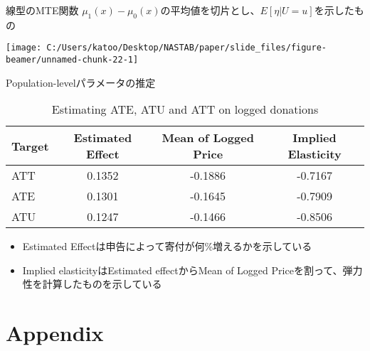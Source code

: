 \documentclass[
  ignorenonframetext,
  aspectratio=169,
]{beamer}
\providecommand{\tightlist}{%
  \setlength{\itemsep}{0pt}\setlength{\parskip}{0pt}}
\begin{document}
\begin{frame}{線型のMTE関数}
\protect\hypertarget{ux7ddaux578bux306emteux95a2ux6570}{}
\(\mu_1(x) - \mu_0(x)\)の平均値を切片とし、\(E[\eta | U = u]\)を示したもの

\begin{center}\texttt{[image: C:/Users/katoo/Desktop/NASTAB/paper/slide\_files/figure-beamer/unnamed-chunk-22-1]} \end{center}
\end{frame}

\begin{frame}{Population-levelパラメータの推定}
\protect\hypertarget{population-levelux30d1ux30e9ux30e1ux30fcux30bfux306eux63a8ux5b9a}{}
\begin{table}

\caption{\label{tab:unnamed-chunk-23}Estimating ATE, ATU and ATT on logged donations}
\centering
\fontsize{7}{9}\selectfont
\begin{tabular}[t]{lccc}
\toprule
Target & Estimated Effect & Mean of Logged Price & Implied Elasticity\\
\midrule
ATT & 0.1352 & -0.1886 & -0.7167\\
ATE & 0.1301 & -0.1645 & -0.7909\\
ATU & 0.1247 & -0.1466 & -0.8506\\
\bottomrule
\end{tabular}
\end{table}

\begin{itemize}
\tightlist
\item
  Estimated Effectは申告によって寄付が何\%増えるかを示している
\item
  Implied elasticityはEstimated effectからMean of Logged Priceを割って、弾力性を計算したものを示している
\end{itemize}
\end{frame}

\hypertarget{appendix}{%
\section{Appendix}\label{appendix}}
\end{document}
